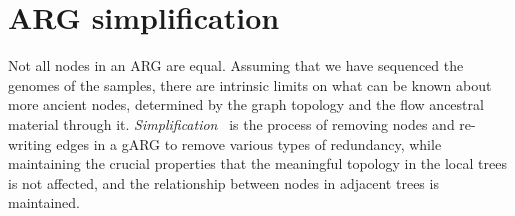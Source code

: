 \documentclass{article}
\begin{document}
\section*{ARG simplification}\label{ARG_simplification}

Not all nodes in an ARG are equal. Assuming that we have sequenced the
genomes of the samples, there are intrinsic limits on what can
be known about more ancient nodes, determined by the graph topology
and the flow ancestral material through it.
\emph{Simplification}~\citep{kelleher2018efficient} is the process
of removing nodes and re-writing edges in a gARG to remove
various types of redundancy, while maintaining the crucial properties
that the meaningful topology in the local trees is not affected,
and the relationship between nodes in adjacent trees is maintained.
\end{document}
